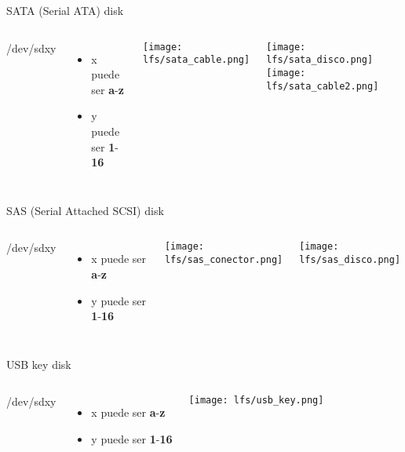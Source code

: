 \begin{frame}[c]{SATA (Serial ATA) disk}

  \begin{columns}
      {\huge /dev/sd{\color{red}x}{\color{blue}y}}
      \begin{itemize}
        \item {\color{red}x} puede ser \textbf{a}-\textbf{z}
        \item {\color{blue}y} puede ser \textbf{1}-\textbf{16}
      \end{itemize}
      \begin{center}
        \texttt{[image: lfs/sata\_cable.png]}
      \end{center}
      \begin{center}
        \texttt{[image: lfs/sata\_disco.png]}
        \texttt{[image: lfs/sata\_cable2.png]}
      \end{center}
  \end{columns}
\end{frame}

\begin{frame}[c]{SAS (Serial Attached SCSI) disk}

  \begin{columns}
      {\huge /dev/sd{\color{red}x}{\color{blue}y}}
      \begin{itemize}
        \item {\color{red}x} puede ser \textbf{a}-\textbf{z}
        \item {\color{blue}y} puede ser \textbf{1}-\textbf{16}
      \end{itemize}
      \begin{center}
        \texttt{[image: lfs/sas\_conector.png]}
      \end{center}
      \begin{center}
        \texttt{[image: lfs/sas\_disco.png]}
      \end{center}
  \end{columns}
\end{frame}

\begin{frame}[c]{USB key disk}

  \begin{columns}
      {\huge /dev/sd{\color{red}x}{\color{blue}y}}
      \begin{itemize}
        \item {\color{red}x} puede ser \textbf{a}-\textbf{z}
        \item {\color{blue}y} puede ser \textbf{1}-\textbf{16}
      \end{itemize}
      \begin{center}
        \texttt{[image: lfs/usb\_key.png]}
      \end{center}
  \end{columns}
\end{frame}

